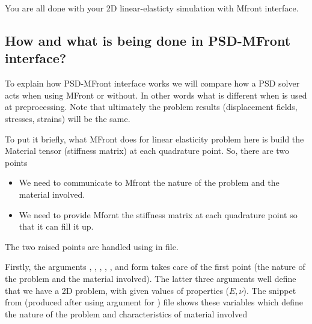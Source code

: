You are all done with your 2D linear-elasticty simulation with Mfront
interface.

\subsection{How and what is being done in PSD-MFront interface? }

To explain how PSD-MFront interface works we will compare how a PSD
solver acts when using MFront or without. In other words what is
different when  is used at preprocessing. Note that
ultimately the problem results (displacement fields, stresses, strains)
will be the same.

To put it briefly, what MFront does for linear elasticity problem here
is build the Material tensor (stiffness matrix) at each quadrature
point. So, there are two points

\begin{itemize}
\item We need to communicate to Mfront the nature of the problem and the material involved.
\item We need to provide Mfornt the stiffness matrix at each quadrature point so that it can fill it up.
\end{itemize}

The two raised points are handled using  in
 file.

Firstly, the arguments , ,
,
,
,
 and
 form
 takes care of the first point (the nature of
the problem and the material involved). The latter three arguments well
define that we have a 2D problem, with given values of properties
(\(E, \nu\)). The snippet from  (produced
after using  argument for ) file
shows these variables which define the nature of the problem and
characteristics of material involved

